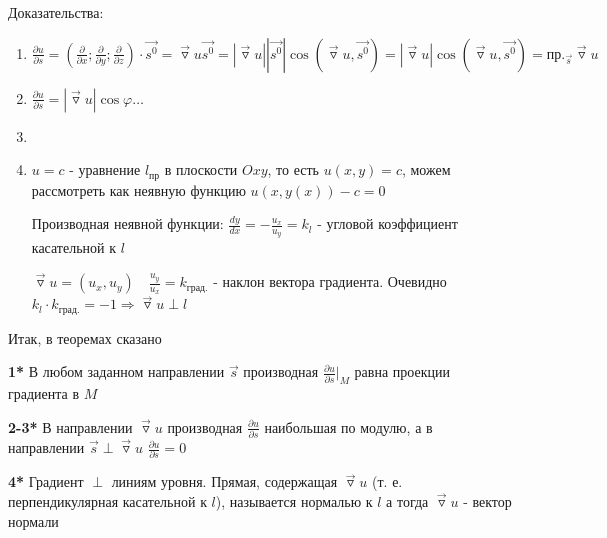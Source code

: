 \documentclass[12pt]{article}
\begin{document}
    Доказательства:

    \begin{enumerate}
        \item $\frac{\partial u}{\partial s} = (\frac{\partial}{\partial x}; \frac{\partial}{\partial y}; \frac{\partial}{\partial z}) \cdot \overrightarrow{s^0} =
        \overrightarrow{\triangledown} u \overrightarrow{s^0} = |\overrightarrow{\triangledown} u| |\overrightarrow{s^0}| \cos(\overrightarrow{\triangledown} u, \overrightarrow{s^0}) =
        |\overrightarrow{\triangledown} u| \cos(\overrightarrow{\triangledown} u, \overrightarrow{s^0}) = \text{пр.}_{\overrightarrow{s}} \overrightarrow{\triangledown} u$

        \item $\frac{\partial u}{\partial s} = |\overrightarrow{\triangledown} u| \cos\varphi \dots $ \Lab

        \item \Lab

        \item $u = c$ - уравнение $l_{\text{пр}}$ в плоскости $Oxy$, то есть $u(x, y) = c$, можем рассмотреть как неявную функцию $u(x, y(x)) - c = 0$

        Производная неявной функции: $\frac{dy}{dx} = -\frac{u_x}{u_y} = k_l$ - угловой коэффициент касательной к $l$

        $\overrightarrow{\triangledown} u = (u_x, u_y) \quad \frac{u_y}{u_x} = k_{\text{град.}}$ - наклон вектора градиента.
        Очевидно $k_l \cdot k_{\text{град.}} = -1 \Longrightarrow \overrightarrow{\triangledown} u \perp l$
    \end{enumerate}



    \Nota Итак, в теоремах сказано

    \textbf{1*} В любом заданном направлении $\overrightarrow{s}$ производная $\frac{\partial u}{\partial s} |_M$ равна проекции градиента в $M$

    \textbf{2-3*} В направлении $\overrightarrow{\triangledown} u$ производная $\frac{\partial u}{\partial s}$ наибольшая по модулю,
    а в направлении $\overrightarrow{s} \perp \overrightarrow{\triangledown} u$ $\frac{\partial u}{\partial s} = 0$

    \textbf{4*} Градиент $\perp$ линиям уровня.
    Прямая, содержащая $\overrightarrow{\triangledown} u$ (т. е. перпендикулярная касательной к $l$), называется нормалью к $l$
    а тогда $\overrightarrow{\triangledown} u$ - вектор нормали
\end{document}
